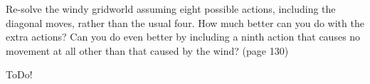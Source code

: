 
\begin{exercise}

Re-solve the windy gridworld assuming eight possible actions, including the diagonal moves, rather than the usual four.
How much better can you do with the extra actions?
Can you do even better by including a ninth action that causes no movement at all other than that caused by the wind?
(page 130)

\end{exercise}


\begin{solution}

ToDo!

\end{solution}

